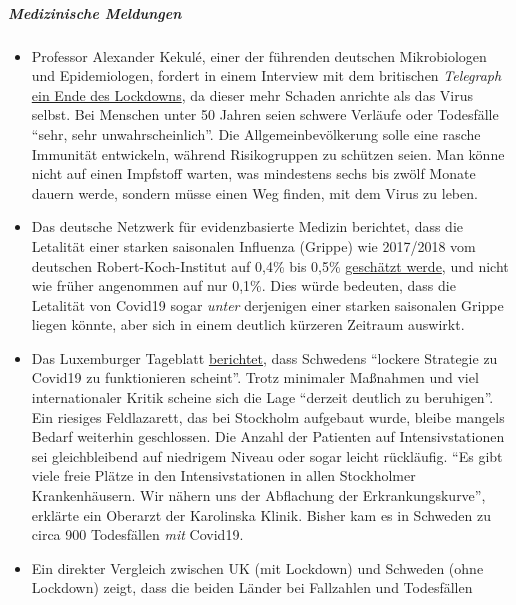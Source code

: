 \hypertarget{medizinische-meldungen}{%
\subparagraph{\texorpdfstring{\textbf{Medizinische
Meldungen}}{Medizinische Meldungen}}\label{medizinische-meldungen}}

\begin{itemize}
\tightlist
\item
  Professor Alexander Kekulé, einer der führenden deutschen
  Mikrobiologen und Epidemiologen, fordert in einem Interview mit dem
  britischen \emph{Telegraph}
  \href{https://www.telegraph.co.uk/news/2020/04/11/german-scientist-predicted-european-epidemic-calls-end-lockdown/}{ein
  Ende des Lockdowns}, da dieser mehr Schaden anrichte als das Virus
  selbst. Bei Menschen unter 50 Jahren seien schwere Verläufe oder
  Todesfälle ``sehr, sehr unwahrscheinlich''. Die Allgemein­bevölkerung
  solle eine rasche Immunität entwickeln, während Risikogruppen zu
  schützen seien. Man könne nicht auf einen Impfstoff warten, was
  mindestens sechs bis zwölf Monate dauern werde, sondern müsse einen
  Weg finden, mit dem Virus zu leben.
\item
  Das deutsche Netzwerk für evidenzbasierte Medizin berichtet, dass die
  Letalität einer starken saisonalen Influenza (Grippe) wie 2017/2018
  vom deutschen Robert-Koch-Institut auf 0,4\% bis 0,5\%
  \href{https://www.ebm-netzwerk.de/en/publications/covid-19}{geschätzt
  werde}, und nicht wie früher angenommen auf nur 0,1\%. Dies würde
  bedeuten, dass die Letalität von Covid19 sogar \emph{unter} derjenigen
  einer starken saisonalen Grippe liegen könnte, aber sich in einem
  deutlich kürzeren Zeitraum auswirkt.
\item
  Das Luxemburger Tageblatt
  \href{https://swprs.files.wordpress.com/2020/04/volksblatt_schweden_corona_20200414_18.pdf}{berichtet},
  dass Schwedens ``lockere Strategie zu Covid19 zu funktionieren
  scheint''. Trotz minimaler Maßnahmen und viel internationaler Kritik
  scheine sich die Lage ``derzeit deutlich zu beruhigen''. Ein riesiges
  Feldlazarett, das bei Stockholm aufgebaut wurde, bleibe mangels Bedarf
  weiterhin geschlossen. Die Anzahl der Patienten auf Intensivstationen
  sei gleichbleibend auf niedrigem Niveau oder sogar leicht rückläufig.
  ``Es gibt viele freie Plätze in den Intensivstationen in allen
  Stockholmer Krankenhäusern. Wir nähern uns der Abflachung der
  Erkrankungskurve'', erklärte ein Oberarzt der Karolinska Klinik.
  Bisher kam es in Schweden zu circa 900 Todesfällen \emph{mit} Covid19.
\item
  Ein direkter Vergleich zwischen UK (mit Lockdown) und Schweden (ohne
  Lockdown) zeigt, dass die beiden Länder bei Fallzahlen und Todesfällen

\end{itemize}
